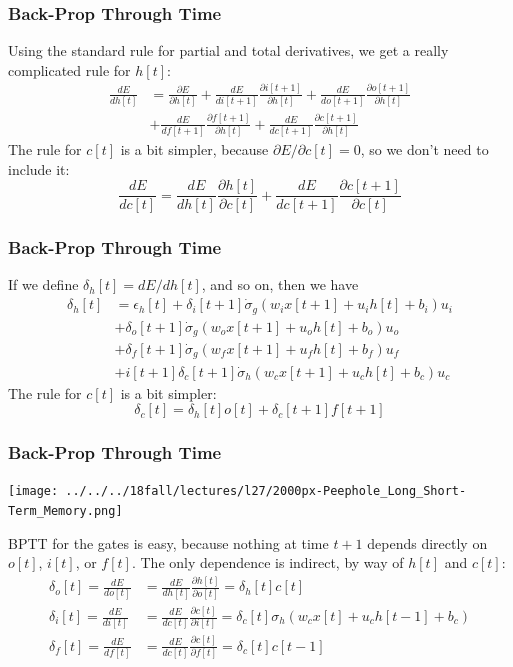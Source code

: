 \documentclass{beamer}
\begin{document}
\begin{frame}
  \frametitle{Back-Prop Through Time}

  Using the standard rule for partial and total derivatives, we get a
  really complicated rule for $h[t]$:
  \begin{align*}
    \frac{dE}{dh[t]}&=
    \frac{\partial E}{\partial h[t]}+
    \frac{dE}{di[t+1]}\frac{\partial i[t+1]}{\partial h[t]}+
    \frac{dE}{do[t+1]}\frac{\partial o[t+1]}{\partial h[t]}\\
    &+\frac{dE}{df[t+1]}\frac{\partial f[t+1]}{\partial h[t]}+
    \frac{dE}{dc[t+1]}\frac{\partial c[t+1]}{\partial h[t]}
  \end{align*}
  The rule for $c[t]$ is a bit simpler, because $\partial E/\partial
  c[t]=0$, so we don't need to include it:
  \[
  \frac{dE}{dc[t]}=\frac{dE}{dh[t]}\frac{\partial h[t]}{\partial c[t]}+
  \frac{dE}{dc[t+1]}\frac{\partial c[t+1]}{\partial c[t]}
  \]
\end{frame}
\begin{frame}
  \frametitle{Back-Prop Through Time}

  If we define $\delta_h[t]=dE/dh[t]$, and so on, then we have
  \begin{align*}
    \delta_h[t]&=\epsilon_h[t]+\delta_i[t+1]\dot\sigma_g(w_i x[t+1]+u_i h[t]+b_i)u_i\\
    &+\delta_o[t+1]\dot\sigma_g(w_o x[t+1]+u_o h[t]+b_o)u_o\\
    &+\delta_f[t+1]\dot\sigma_g(w_f x[t+1]+u_f h[t]+b_f)u_f\\
    &+i[t+1]\delta_c[t+1]\dot\sigma_h\left(w_cx[t+1]+u_ch[t]+b_c\right)u_c
  \end{align*}
  The rule for $c[t]$ is a bit simpler:
  \[
  \delta_c[t]=\delta_h[t]o[t]+
  \delta_c[t+1]f[t+1]
  \]
\end{frame}
\begin{frame}
  \frametitle{Back-Prop Through Time}

  \centerline{\texttt{[image: ../../../18fall/lectures/l27/2000px-Peephole\_Long\_Short-Term\_Memory.png]}}

  BPTT for the gates is easy, because nothing at time $t+1$ depends
  directly on $o[t]$, $i[t]$, or $f[t]$.  The only dependence is
  indirect, by way of $h[t]$ and $c[t]$: 
  \begin{align*}
    \delta_o[t]=\frac{dE}{do[t]}&=
    \frac{dE}{dh[t]}\frac{\partial h[t]}{\partial o[t]}=\delta_h[t]c[t]\\
    \delta_i[t]=\frac{dE}{di[t]}&=
    \frac{dE}{dc[t]}\frac{\partial c[t]}{\partial i[t]}=
    \delta_c[t]\sigma_h\left(w_cx[t]+u_ch[t-1]+b_c\right)\\
    \delta_f[t]=\frac{dE}{df[t]}&=
    \frac{dE}{dc[t]}\frac{\partial c[t]}{\partial f[t]}=\delta_c[t]c[t-1]
  \end{align*}
\end{frame}
\end{document}
